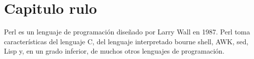 \section{Capitulo rulo}
Perl es un lenguaje de programación diseñado por Larry Wall en 1987. Perl toma características del lenguaje C, del lenguaje interpretado bourne shell, AWK, sed, Lisp y, en un grado inferior, de muchos otros lenguajes de programación.